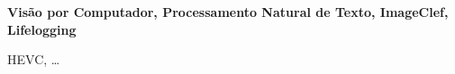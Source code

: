 \TitlePage
  \vspace*{55mm}
       {\textbf{Visão por Computador, Processamento Natural de Texto, ImageClef, Lifelogging }}
       {\lipsum[3]}
  \TEXT{}
       {\lipsum[4]}
\EndTitlePage
\titlepage\ \endtitlepage %

\TitlePage
  \vspace*{55mm}
       {HEVC, \ldots}
       {\lipsum[3]}
  \TEXT{}
       {\lipsum[4]}
\EndTitlePage
\titlepage\ \endtitlepage %
